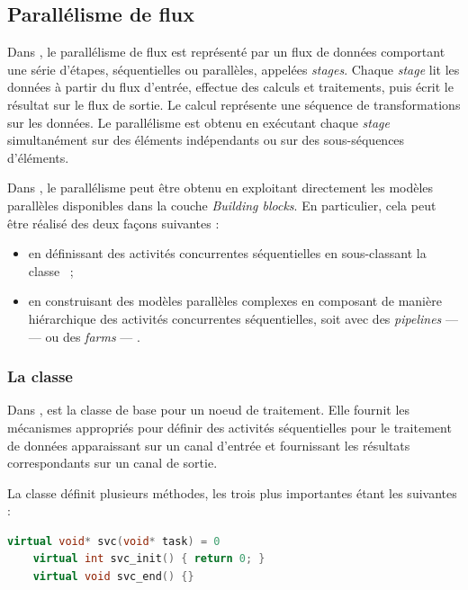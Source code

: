 \subsection{Parall\'elisme de flux}

Dans , le parall\'elisme de flux est repr\'esent\'e par un flux de donn\'ees comportant une s\'erie d'\'etapes, s\'equentielles ou parall\`eles, appel\'ees \emph{stages}. Chaque \emph{stage} lit les donn\'ees \`a partir du flux d'entr\'ee, effectue des calculs et traitements, puis \'ecrit le r\'esultat sur le flux de sortie. Le calcul repr\'esente une s\'equence de transformations sur les donn\'ees. Le parall\'elisme est obtenu en ex\'ecutant chaque \emph{stage} simultan\'ement sur des \'el\'ements ind\'ependants ou sur des sous-s\'equences d'\'el\'ements. 

Dans , le parall\'elisme peut \^etre obtenu en exploitant directement les mod\`eles parall\`eles disponibles dans la couche \emph{Building blocks}. En particulier, cela peut \^etre r\'ealis\'e des deux fa\c{c}ons suivantes :

\begin{itemize}
\item en d\'efinissant des activit\'es concurrentes s\'equentielles en sous-classant la classe ~;
 
\item en construisant des mod\`eles parall\`eles complexes en composant de mani\`ere hi\'erarchique des activit\'es concurrentes s\'equentielles, soit avec des \emph{pipelines} ---  --- ou des \emph{farms} --- .
\end{itemize}

\subsubsection*{La classe }

Dans ,  est la classe de base pour un noeud de traitement. Elle fournit les m\'ecanismes appropri\'es pour d\'efinir des activit\'es s\'equentielles pour le traitement de données apparaissant sur un canal d'entr\'ee et fournissant les r\'esultats correspondants sur un canal de sortie. 

\goodbreak
\begin{samepage}
La classe  d\'efinit plusieurs m\'ethodes, les trois plus importantes \'etant les suivantes :
\begin{lstlisting}[language=c++]
    virtual void* svc(void* task) = 0
    virtual int svc_init() { return 0; } 
    virtual void svc_end() {} 
\end{lstlisting}
\end{samepage}

